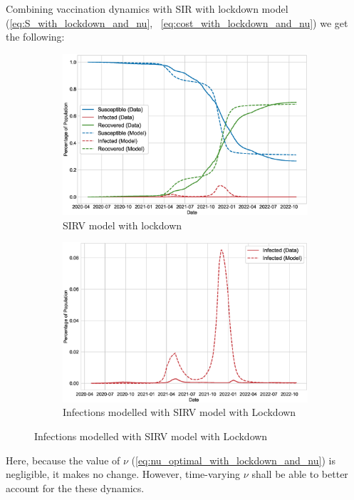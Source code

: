 \documentclass[tikz,fleqn,12pt]{wlscirep}
\begin{document}
Combining vaccination dynamics with SIR with lockdown model (\ref{eq:S_with_lockdown_and_nu}, ~\ref{eq:cost_with_lockdown_and_nu}) we get the following:
\begin{figure}[H]
  \centering
  \caption{SIRV Model with lockdown for India}

  \begin{subfigure}[t]{\textwidth}
    \centering
    \includegraphics[scale=0.50]{images/SIRV_model_with_lockdown_IND.eps}
    \caption{SIRV model with lockdown}
    \label{fig:SIRV_model_with_lockdown_IND}
  \end{subfigure}

  \begin{subfigure}[t]{\textwidth}
    \centering
    \includegraphics[scale=0.50]{images/SIRV_model_with_lockdown_infections_IND.eps}
    \caption{Infections modelled with SIRV model with Lockdown}
    \label{fig:SIRV_model_with_lockdown_infections_IND}
  \end{subfigure}

\end{figure}
Here, because the value of $\nu$ (\ref{eq:nu_optimal_with_lockdown_and_nu}) is negligible, it makes no change. However, time-varying $\nu$ shall be able to better account for the these dynamics.
\end{document}
